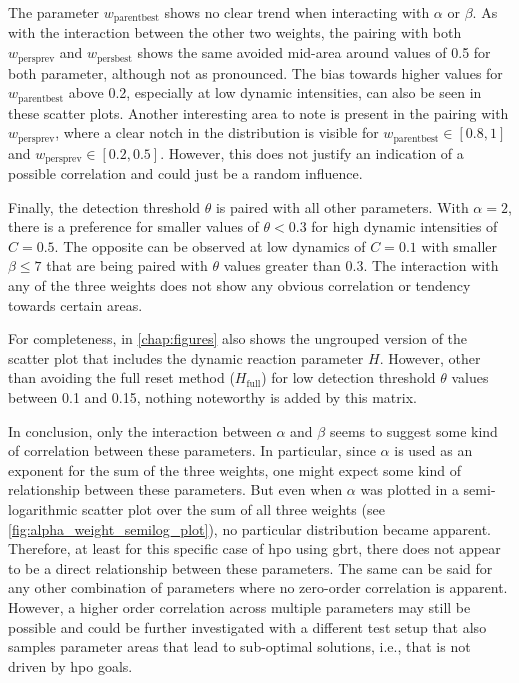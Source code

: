 The parameter $w_{\text{parentbest}}$ shows no clear trend when interacting with $\alpha$ or $\beta$. As with the interaction between the other two weights, the pairing with both $w_{\text{persprev}}$ and $w_{\text{persbest}}$ shows the same avoided mid-area around values of 0.5 for both parameter, although not as pronounced. The bias towards higher values for $w_{\text{parentbest}}$ above 0.2, especially at low dynamic intensities, can also be seen in these scatter plots. Another interesting area to note is present in the pairing with $w_{\text{persprev}}$, where a clear notch in the distribution is visible for $w_{\text{parentbest}} \in [0.8,1]$ and $w_{\text{persprev}} \in [0.2,0.5]$. However, this does not justify an indication of a possible correlation and could just be a random influence. 

Finally, the detection threshold $\theta$ is paired with all other parameters. With $\alpha = 2$, there is a preference for smaller values of $\theta < 0.3$ for high dynamic intensities of $C=0.5$. The opposite can be observed at low dynamics of $C=0.1$ with smaller $\beta \leq 7$ that are being paired with $\theta$ values greater than 0.3. The interaction with any of the three weights does not show any obvious correlation or tendency towards certain areas.

For completeness,  in \cref{chap:figures} also shows the ungrouped version of the scatter plot that includes the dynamic reaction parameter $H$. However, other than avoiding the full reset method ($H_\text{full}$) for low detection threshold $\theta$ values between 0.1 and 0.15, nothing noteworthy is added by this matrix.

In conclusion, only the interaction between $\alpha$ and $\beta$ seems to suggest some kind of correlation between these parameters. In particular, since $\alpha$ is used as an exponent for the sum of the three weights, one might expect some kind of relationship between these parameters. But even when $\alpha$ was plotted in a semi-logarithmic scatter plot over the sum of all three weights (see \cref{fig:alpha_weight_semilog_plot}), no particular distribution became apparent. Therefore, at least for this specific case of \gls{hpo} using \gls{gbrt}, there does not appear to be a direct relationship between these parameters. The same can be said for any other combination of parameters where no zero-order correlation is apparent. However, a higher order correlation across multiple parameters may still be possible and could be further investigated with a different test setup that also samples parameter areas that lead to sub-optimal solutions, i.e., that is not driven by \gls{hpo} goals.



